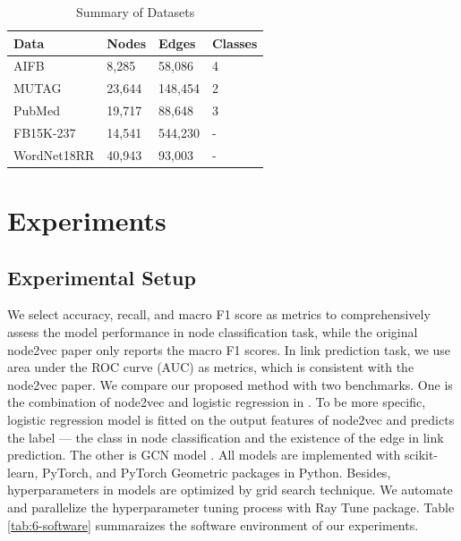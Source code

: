 \documentclass[sigconf]{acmart}
\begin{document}
\begin{table}[!ht]
    \centering
    \caption{Summary of Datasets}
    \label{tab:5-data}
    \begin{tabular}{llll}
        \toprule
        \textbf{Data} & \textbf{Nodes} & \textbf{Edges} & \textbf{Classes} \\
        \midrule
        AIFB & 8,285 & 58,086 & 4\\
        MUTAG & 23,644 & 148,454 & 2\\
        PubMed & 19,717 & 88,648 & 3\\
        FB15K-237 & 14,541 & 544,230 & -\\
        WordNet18RR & 40,943 & 93,003 & -\\
        \bottomrule
    \end{tabular}
\end{table}

\section{Experiments}


\subsection{Experimental Setup}
We select accuracy, recall, and macro F1 score as metrics to comprehensively assess the model performance in node classification task, while the original node2vec paper \cite{node2vec} only reports the macro F1 scores. In link prediction task, we use area under the ROC curve (AUC) as metrics, which is consistent with the node2vec paper. We compare our proposed method with two benchmarks. One is the combination of node2vec and logistic regression in \cite{node2vec}. To be more specific, logistic regression model is fitted on the output features of node2vec and predicts the label --- the class in node classification and the existence of the edge in link prediction. The other is GCN model \cite{gcn}. All models are implemented with scikit-learn, PyTorch, and PyTorch Geometric packages in Python. Besides, hyperparameters in models are optimized by grid search technique. We automate and parallelize the hyperparameter tuning process with Ray Tune package. Table \ref{tab:6-software} summaraizes the software environment of our experiments.
\end{document}
